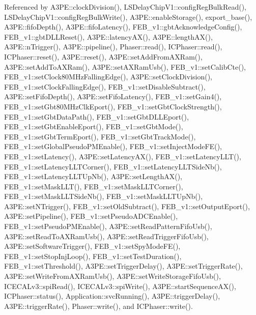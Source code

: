Referenced by A3\+P\+E\+::clock\+Division(), L\+S\+Delay\+Chip\+V1\+::config\+Reg\+Bulk\+Read(), L\+S\+Delay\+Chip\+V1\+::config\+Reg\+Bulk\+Write(), A3\+P\+E\+::enable\+Storage(), export\+\_\+base(), A3\+P\+E\+::fifo\+Depth(), A3\+P\+E\+::fifo\+Latency(), F\+E\+B\+\_\+v1\+::gbt\+Acknowledge\+Config(), F\+E\+B\+\_\+v1\+::gbt\+D\+L\+L\+Reset(), A3\+P\+E\+::latency\+A\+X(), A3\+P\+E\+::length\+A\+X(), A3\+P\+E\+::n\+Trigger(), A3\+P\+E\+::pipeline(), Phaser\+::read(), I\+C\+Phaser\+::read(), I\+C\+Phaser\+::reset(), A3\+P\+E\+::reset(), A3\+P\+E\+::set\+Add\+From\+A\+X\+Ram(), A3\+P\+E\+::set\+Add\+To\+A\+X\+Ram(), A3\+P\+E\+::set\+A\+X\+Ram\+Usb(), F\+E\+B\+\_\+v1\+::set\+Calib\+Cte(), F\+E\+B\+\_\+v1\+::set\+Clock80\+M\+Hz\+Falling\+Edge(), A3\+P\+E\+::set\+Clock\+Division(), F\+E\+B\+\_\+v1\+::set\+Clock\+Falling\+Edge(), F\+E\+B\+\_\+v1\+::set\+Disable\+Subtract(), A3\+P\+E\+::set\+Fifo\+Depth(), A3\+P\+E\+::set\+Fifo\+Latency(), F\+E\+B\+\_\+v1\+::set\+Gain4(), F\+E\+B\+\_\+v1\+::set\+Gbt80\+M\+Hz\+Clk\+Eport(), F\+E\+B\+\_\+v1\+::set\+Gbt\+Clock\+Strength(), F\+E\+B\+\_\+v1\+::set\+Gbt\+Data\+Path(), F\+E\+B\+\_\+v1\+::set\+Gbt\+D\+L\+L\+Eport(), F\+E\+B\+\_\+v1\+::set\+Gbt\+Enable\+Eport(), F\+E\+B\+\_\+v1\+::set\+Gbt\+Mode(), F\+E\+B\+\_\+v1\+::set\+Gbt\+Term\+Eport(), F\+E\+B\+\_\+v1\+::set\+Gbt\+Track\+Mode(), F\+E\+B\+\_\+v1\+::set\+Global\+Pseudo\+P\+M\+Enable(), F\+E\+B\+\_\+v1\+::set\+Inject\+Mode\+F\+E(), F\+E\+B\+\_\+v1\+::set\+Latency(), A3\+P\+E\+::set\+Latency\+A\+X(), F\+E\+B\+\_\+v1\+::set\+Latency\+L\+L\+T(), F\+E\+B\+\_\+v1\+::set\+Latency\+L\+L\+T\+Corner(), F\+E\+B\+\_\+v1\+::set\+Latency\+L\+L\+T\+Side\+Nb(), F\+E\+B\+\_\+v1\+::set\+Latency\+L\+L\+T\+Up\+Nb(), A3\+P\+E\+::set\+Length\+A\+X(), F\+E\+B\+\_\+v1\+::set\+Mask\+L\+L\+T(), F\+E\+B\+\_\+v1\+::set\+Mask\+L\+L\+T\+Corner(), F\+E\+B\+\_\+v1\+::set\+Mask\+L\+L\+T\+Side\+Nb(), F\+E\+B\+\_\+v1\+::set\+Mask\+L\+L\+T\+Up\+Nb(), A3\+P\+E\+::set\+N\+Trigger(), F\+E\+B\+\_\+v1\+::set\+Old\+Subtract(), F\+E\+B\+\_\+v1\+::set\+Output\+Eport(), A3\+P\+E\+::set\+Pipeline(), F\+E\+B\+\_\+v1\+::set\+Pseudo\+A\+D\+C\+Enable(), F\+E\+B\+\_\+v1\+::set\+Pseudo\+P\+M\+Enable(), A3\+P\+E\+::set\+Read\+Pattern\+Fifo\+Usb(), A3\+P\+E\+::set\+Read\+To\+A\+X\+Ram\+Usb(), A3\+P\+E\+::set\+Read\+Trigger\+Fifo\+Usb(), A3\+P\+E\+::set\+Software\+Trigger(), F\+E\+B\+\_\+v1\+::set\+Spy\+Mode\+F\+E(), F\+E\+B\+\_\+v1\+::set\+Stop\+Inj\+Loop(), F\+E\+B\+\_\+v1\+::set\+Test\+Duration(), F\+E\+B\+\_\+v1\+::set\+Threshold(), A3\+P\+E\+::set\+Trigger\+Delay(), A3\+P\+E\+::set\+Trigger\+Rate(), A3\+P\+E\+::set\+Write\+From\+A\+X\+Ram\+Usb(), A3\+P\+E\+::set\+Write\+Storage\+Fifo\+Usb(), I\+C\+E\+C\+A\+Lv3\+::spi\+Read(), I\+C\+E\+C\+A\+Lv3\+::spi\+Write(), A3\+P\+E\+::start\+Sequence\+A\+X(), I\+C\+Phaser\+::status(), Application\+::svc\+Running(), A3\+P\+E\+::trigger\+Delay(), A3\+P\+E\+::trigger\+Rate(), Phaser\+::write(), and I\+C\+Phaser\+::write().


